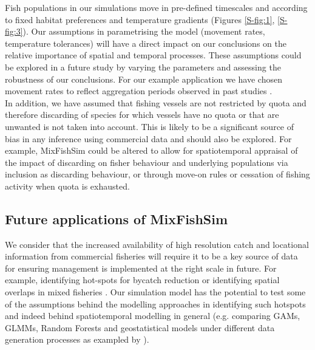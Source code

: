\documentclass[review]{elsarticle}
\begin{document}
Fish populations in our simulations move in pre-defined timescales and
according to fixed habitat preferences and temperature gradients (Figures
\ref{S-fig:1}, \ref{S-fig:3}). Our assumptions in parametrising the model
(movement rates, temperature tolerances) will have a direct impact on our
conclusions on the relative importance of spatial and temporal processes. These
assumptions could be explored in a future study by varying the parameters and
assessing the robustness of our conclusions. For our example application we
have chosen movement rates to reflect aggregation periods observed in past
studies \citep{Poos2007}. \\

In addition, we have assumed that fishing vessels are not restricted by quota
and therefore discarding of species for which vessels have no quota or that are
unwanted is not taken into account. This is likely to be a significant source
of bias in any inference using commercial data and should also be explored. For
example, MixFishSim could be altered to allow for spatiotemporal appraisal of
the impact of discarding on fisher behaviour and underlying populations via
inclusion as discarding behaviour, or through move-on rules or cessation of
fishing activity when quota is exhausted. \\

\subsection{Future applications of MixFishSim}

We consider that the increased availability of high resolution catch and
locational information from commercial fisheries will require it to be a key
source of data for ensuring management is implemented at the right scale in
future. For example, identifying hot-spots for bycatch reduction or identifying
spatial overlaps in mixed fisheries \citep{Dolder2018, Gardner2008, Little2014,
	Dedman2015, Ward2015}. Our simulation model has the potential to test
some of the assumptions behind the modelling approaches in identifying such
hotspots and indeed behind spatiotemporal modelling in general (e.g. comparing
GAMs, GLMMs, Random Forests and geostatistical models under different data
generation processes as exampled by \cite{Stock2019}). \\
\end{document}
